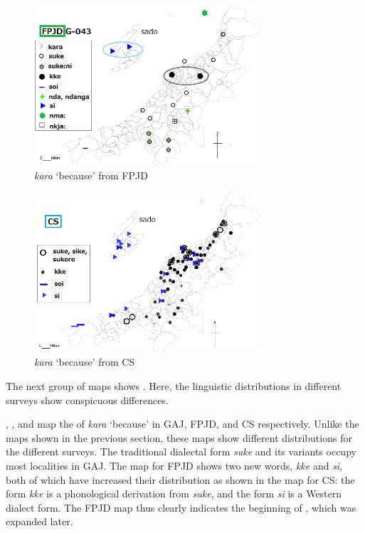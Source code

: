 \documentclass[output=paper]{LSP/langsci}
\begin{document}
\begin{figure}
\includegraphics[width=0.75\textwidth]{illustrations/fuku2_fig4b}
\caption{\textit{kara} `because' from FPJD}
\label{fig:fuku:4b}
\end{figure}

\begin{figure}
\includegraphics[width=0.75\textwidth]{illustrations/fuku2_fig4c}
\caption{\textit{kara} `because' from CS}
\label{fig:fuku:4c}
\end{figure}

The next group of maps shows . Here, the linguistic distributions in different surveys show conspicuous differences. 

, , and  map the  of \textit{kara} `because'  in \textsc{GAJ}, \textsc{FPJD}, and \textsc{CS} respectively.  Unlike the maps shown in the previous section, these maps show different distributions for the different surveys.  The traditional dialectal form \textit{suke} and its variants occupy most localities in \textsc{GAJ}.  The map for \textsc{FPJD} shows two new words, \textit{kke} and \textit{si}, both of which have increased their distribution as shown in the map for \textsc{CS}: the form \textit{kke} is a phonological derivation from \textit{suke}, and the form \textit{si} is a Western dialect form.  The \textsc{FPJD} map thus clearly indicates the beginning of , which was expanded later.
\end{document}
